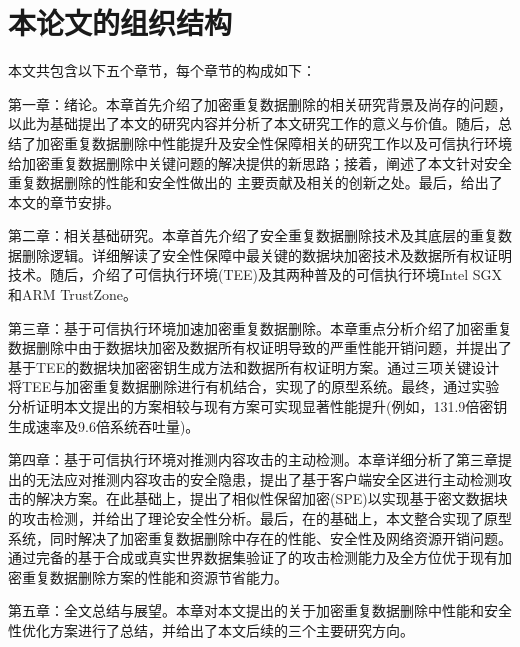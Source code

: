 \section{本论文的组织结构}
本文共包含以下五个章节，每个章节的构成如下：

第一章：绪论。本章首先介绍了加密重复数据删除的相关研究背景及尚存的问题，以此为基础提出了本文的研究内容并分析了本文研究工作的意义与价值。随后，总结了加密重复数据删除中性能提升及安全性保障相关的研究工作以及可信执行环境给加密重复数据删除中关键问题的解决提供的新思路；接着，阐述了本文针对安全重复数据删除的性能和安全性做出的 主要贡献及相关的创新之处。最后，给出了本文的章节安排。

第二章：相关基础研究。本章首先介绍了安全重复数据删除技术及其底层的重复数据删除逻辑。详细解读了安全性保障中最关键的数据块加密技术及数据所有权证明技术。随后，介绍了可信执行环境(TEE)及其两种普及的可信执行环境Intel SGX和ARM TrustZone。

第三章：基于可信执行环境加速加密重复数据删除。本章重点分析介绍了加密重复数据删除中由于数据块加密及数据所有权证明导致的严重性能开销问题，并提出了基于TEE的数据块加密密钥生成方法和数据所有权证明方案。通过三项关键设计将TEE与加密重复数据删除进行有机结合，实现了\sysnameS 的原型系统。最终，通过实验分析证明本文提出的方案相较与现有方案可实现显著性能提升(例如，131.9倍密钥生成速率及9.6倍系统吞吐量)。

第四章：基于可信执行环境对推测内容攻击的主动检测。本章详细分析了第三章提出的\sysnameS 无法应对推测内容攻击的安全隐患，提出了基于客户端安全区进行主动检测攻击的解决方案\sysnameF。在此基础上，提出了相似性保留加密(SPE)以实现基于密文数据块的攻击检测，并给出了理论安全性分析。最后，在\sysnameS 的基础上，本文整合\sysnameF 实现了\prototype 原型系统，同时解决了加密重复数据删除中存在的性能、安全性及网络资源开销问题。通过完备的基于合成或真实世界数据集验证了\sysnameF 的攻击检测能力及\prototype 全方位优于现有加密重复数据删除方案的性能和资源节省能力。

第五章：全文总结与展望。本章对本文提出的关于加密重复数据删除中性能和安全性优化方案进行了总结，并给出了本文后续的三个主要研究方向。
